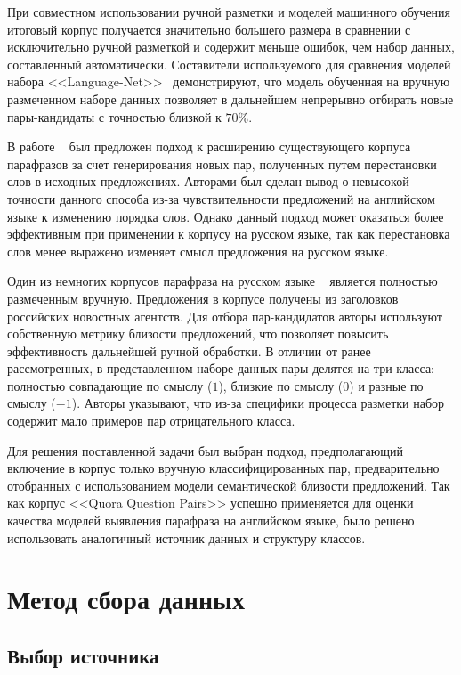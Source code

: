 \documentclass[a4paper,14pt]{extarticle}
\begin{document}
При совместном использовании ручной разметки и моделей машинного обучения итоговый корпус получается значительно большего размера в сравнении с исключительно ручной разметкой и содержит меньше ошибок, чем набор данных, составленный автоматически.
Составители используемого для сравнения моделей набора {<<Language-Net>>}~\autocite{lan-etal-2017-continuously} демонстрируют, что модель обученная на вручную размеченном наборе данных позволяет в дальнейшем непрерывно отбирать новые пары-кандидаты с точностью близкой к $70\%$.

В работе ~\autocite{zhang2019paws} был предложен подход к расширению существующего корпуса парафразов за счет генерирования новых пар, полученных путем перестановки слов в исходных предложениях. Авторами был сделан вывод о невысокой точности данного способа из-за чувствительности предложений на английском языке к изменению порядка слов. Однако данный подход может оказаться более эффективным при применении к корпусу на русском языке, так как перестановка слов менее выражено изменяет смысл предложения на русском языке.

Один из немногих корпусов парафраза на русском языке ~\autocite{pivovarova2017paraphraser} является полностью размеченным вручную. Предложения в корпусе получены из заголовков российских новостных агентств.
Для отбора пар-кандидатов авторы используют собственную метрику близости предложений, что позволяет повысить эффективность дальнейшей ручной обработки. В отличии от ранее рассмотренных, в представленном наборе данных пары делятся на три класса: полностью совпадающие по смыслу ($1$), близкие по смыслу ($0$) и разные по смыслу ($-1$).
Авторы указывают, что из-за специфики процесса разметки набор содержит мало примеров пар отрицательного класса.

Для решения поставленной задачи был выбран подход, предполагающий включение в корпус только вручную классифицированных пар, предварительно отобранных с использованием модели семантической близости предложений.
Так как корпус {<<Quora Question Pairs>>} успешно применяется для оценки качества моделей выявления парафраза на английском языке, было решено использовать аналогичный источник данных и структуру классов.

\section{Метод сбора данных}
\subsection{Выбор источника}
\end{document}
